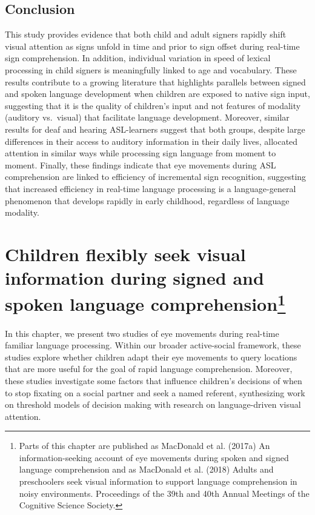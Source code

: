 \documentclass[oneside]{report}
\begin{document}
\section{Conclusion}\label{conclusion}

This study provides evidence that both child and adult signers rapidly
shift visual attention as signs unfold in time and prior to sign offset
during real-time sign comprehension. In addition, individual variation
in speed of lexical processing in child signers is meaningfully linked
to age and vocabulary. These results contribute to a growing literature
that highlights parallels between signed and spoken language development
when children are exposed to native sign input, suggesting that it is
the quality of children's input and not features of modality (auditory
vs.~visual) that facilitate language development. Moreover, similar
results for deaf and hearing ASL-learners suggest that both groups,
despite large differences in their access to auditory information in
their daily lives, allocated attention in similar ways while processing
sign language from moment to moment. Finally, these findings indicate
that eye movements during ASL comprehension are linked to efficiency of
incremental sign recognition, suggesting that increased efficiency in
real-time language processing is a language-general phenomenon that
develops rapidly in early childhood, regardless of language modality.

\chapter[Children flexibly seek visual information during signed and
spoken language comprehension]{\texorpdfstring{Children flexibly seek
visual information during signed and spoken language
comprehension\footnote{Parts of this chapter are published as MacDonald
  et al. (2017a) An information-seeking account of eye movements during
  spoken and signed language comprehension and as MacDonald et al.
  (2018) Adults and preschoolers seek visual information to support
  language comprehension in noisy environments. Proceedings of the 39th
  and 40th Annual Meetings of the Cognitive Science Society.}}{Children flexibly seek visual information during signed and spoken language comprehension}}\label{children-flexibly-seek-visual-information-during-signed-and-spoken-language-comprehension}


In this chapter, we present two studies of eye movements during
real-time familiar language processing. Within our broader active-social
framework, these studies explore whether children adapt their eye
movements to query locations that are more useful for the goal of rapid
language comprehension. Moreover, these studies investigate some factors
that influence children's decisions of when to stop fixating on a social
partner and seek a named referent, synthesizing work on threshold models
of decision making with research on language-driven visual attention.
\end{document}
